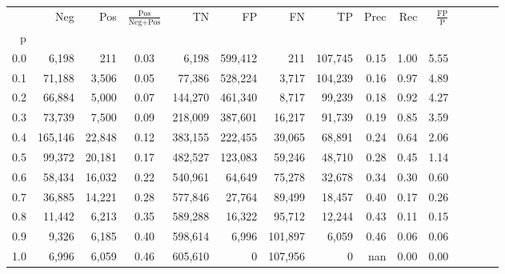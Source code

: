 \begin{tabular}{rrrcrrrrrrrrrrr}
\toprule
{} &      Neg &     Pos & $\frac{\text{Pos}}{\text{Neg}+\text{Pos}}$ &       TN &       FP &       FN &       TP &  Prec &   Rec & $\frac{\text{FP}}{\text{P}}$ \\
p   &          &         &                                            &          &          &          &          &       &       &                              \\
\midrule
0.0 &    6,198 &     211 &                                       0.03 &    6,198 &  599,412 &      211 &  107,745 &  0.15 &  1.00 &                         5.55 \\
0.1 &   71,188 &   3,506 &                                       0.05 &   77,386 &  528,224 &    3,717 &  104,239 &  0.16 &  0.97 &                         4.89 \\
0.2 &   66,884 &   5,000 &                                       0.07 &  144,270 &  461,340 &    8,717 &   99,239 &  0.18 &  0.92 &                         4.27 \\
0.3 &   73,739 &   7,500 &                                       0.09 &  218,009 &  387,601 &   16,217 &   91,739 &  0.19 &  0.85 &                         3.59 \\
0.4 &  165,146 &  22,848 &                                       0.12 &  383,155 &  222,455 &   39,065 &   68,891 &  0.24 &  0.64 &                         2.06 \\
0.5 &   99,372 &  20,181 &                                       0.17 &  482,527 &  123,083 &   59,246 &   48,710 &  0.28 &  0.45 &                         1.14 \\
0.6 &   58,434 &  16,032 &                                       0.22 &  540,961 &   64,649 &   75,278 &   32,678 &  0.34 &  0.30 &                         0.60 \\
0.7 &   36,885 &  14,221 &                                       0.28 &  577,846 &   27,764 &   89,499 &   18,457 &  0.40 &  0.17 &                         0.26 \\
0.8 &   11,442 &   6,213 &                                       0.35 &  589,288 &   16,322 &   95,712 &   12,244 &  0.43 &  0.11 &                         0.15 \\
0.9 &    9,326 &   6,185 &                                       0.40 &  598,614 &    6,996 &  101,897 &    6,059 &  0.46 &  0.06 &                         0.06 \\
1.0 &    6,996 &   6,059 &                                       0.46 &  605,610 &        0 &  107,956 &        0 &   nan &  0.00 &                         0.00 \\
\bottomrule
\end{tabular}
